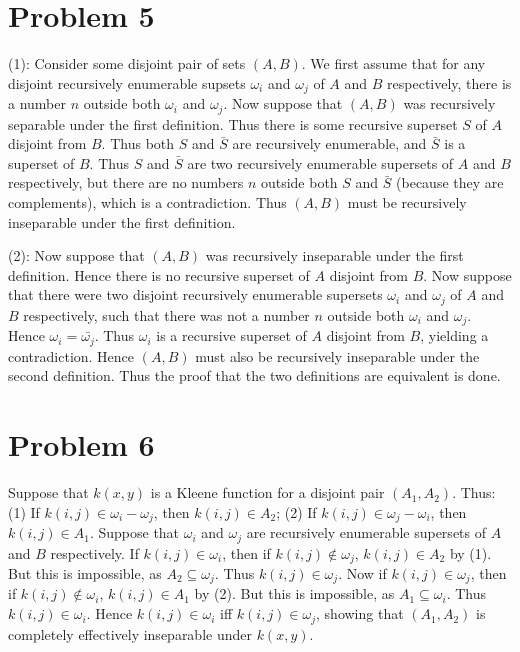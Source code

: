 \documentclass{article}
\theoremstyle{definition}
\begin{document}
\section*{Problem 5}
(1): Consider some disjoint pair of sets $(A,B)$. 
We first assume that for any disjoint recursively enumerable supsets $\omega_i$ and $\omega_j$ of $A$ and $B$ respectively, there is a number $n$ outside both 
$\omega_i$ and $\omega_j$. Now suppose that $(A,B)$ was recursively separable under the first definition. Thus there is some recursive superset $S$ of $A$ disjoint from 
$B$. Thus both $S$ and $\bar{S}$ are recursively enumerable, and $\bar{S}$ is a superset of $B$. Thus $S$ and $\bar{S}$ are two recursively enumerable supersets of 
$A$ and $B$ respectively, but there are no numbers $n$ outside both $S$ and $\bar{S}$ (because they are complements), which is a contradiction. Thus $(A,B)$ must be 
recursively inseparable under the first definition.


(2): Now suppose that $(A,B)$ was recursively inseparable under the first definition. Hence there is no recursive superset of $A$ disjoint from $B$. Now suppose that 
there were two disjoint recursively enumerable supersets $\omega_i$ and $\omega_j$ of $A$ and $B$ respectively, such that there was not a number $n$ outside both 
$\omega_i$ and $\omega_j$. Hence $\omega_i=\bar{\omega_j}$. Thus $\omega_i$ is a recursive superset of $A$ disjoint from $B$, yielding a contradiction. Hence 
$(A,B)$ must also be recursively inseparable under the second definition. Thus the proof that the two definitions are equivalent is done.

\section*{Problem 6}
Suppose that $k(x,y)$ is a Kleene function for a disjoint pair $(A_1,A_2)$. Thus:\newline
(1) If $k(i,j)\in\omega_i-\omega_j$, then $k(i,j)\in A_2$;\newline
(2) If $k(i,j)\in\omega_j-\omega_i$, then $k(i,j)\in A_1$.\newline
Suppose that $\omega_i$ and $\omega_j$ are recursively enumerable supersets of $A$ and $B$ respectively. If $k(i,j)\in\omega_i$, then if 
$k(i,j)\notin\omega_j$, $k(i,j)\in A_2$ by (1). But this is impossible, as $A_2\subseteq\omega_j$. Thus $k(i,j)\in\omega_j$. Now if $k(i,j)\in\omega_j$, then if 
$k(i,j)\notin\omega_i$, $k(i,j)\in A_1$ by (2). But this is impossible, as $A_1\subseteq\omega_i$. Thus $k(i,j)\in\omega_i$. Hence $k(i,j)\in\omega_i$ iff
$k(i,j)\in\omega_j$, showing that $(A_1,A_2)$ is completely effectively inseparable under $k(x,y)$.
\end{document}
